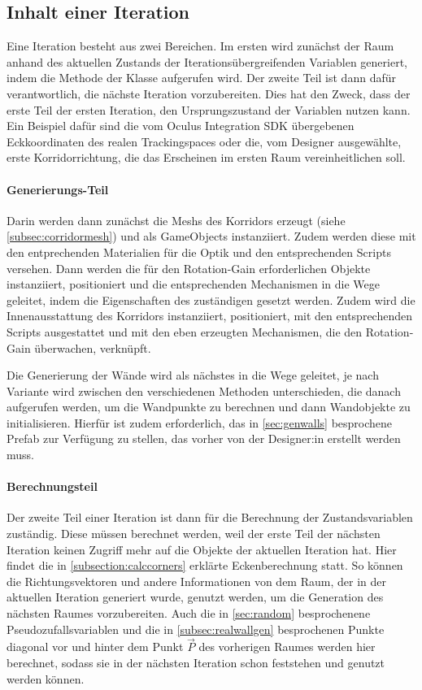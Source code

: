 \subsection{Inhalt einer Iteration}\label{subsec:iteration}
Eine Iteration besteht aus zwei Bereichen. Im ersten wird zunächst der Raum anhand des aktuellen Zustands der Iterationsübergreifenden Variablen generiert, indem die  Methode der  Klasse aufgerufen wird. Der zweite Teil ist dann dafür verantwortlich, die nächste Iteration vorzubereiten. Dies hat den Zweck, dass der erste Teil der ersten Iteration, den Ursprungszustand der Variablen nutzen kann. Ein Beispiel dafür sind die vom Oculus Integration SDK übergebenen Eckkoordinaten des realen Trackingspaces oder die, vom Designer ausgewählte, erste Korridorrichtung, die das Erscheinen im ersten Raum vereinheitlichen soll.

\paragraph*{Generierungs-Teil}
Darin werden dann zunächst die Meshs des Korridors erzeugt (siehe \autoref{subsec:corridormesh}) und als GameObjects instanziiert. Zudem werden diese mit den entprechenden Materialien für die Optik und den entsprechenden Scripts versehen.
Dann werden die für den Rotation-Gain erforderlichen Objekte instanziiert, positioniert und die entsprechenden Mechanismen in die Wege geleitet, indem die Eigenschaften des zuständigen  gesetzt werden.
Zudem wird die Innenausstattung des Korridors instanziiert, positioniert, mit den entsprechenden Scripts ausgestattet und mit den eben erzeugten Mechanismen, die den Rotation-Gain überwachen, verknüpft.

Die Generierung der Wände wird als nächstes in die Wege geleitet, je nach Variante wird zwischen den verschiedenen Methoden unterschieden, die danach aufgerufen werden, um die Wandpunkte zu berechnen und dann Wandobjekte zu initialisieren. Hierfür ist zudem erforderlich, das in \autoref{sec:genwalls} besprochene Prefab zur Verfügung zu stellen, das vorher von der Designer:in erstellt werden muss.

\paragraph*{Berechnungsteil}

Der zweite Teil einer Iteration ist dann für die Berechnung der Zustandsvariablen zuständig. Diese müssen berechnet werden, weil der erste Teil der nächsten Iteration keinen Zugriff mehr auf die Objekte der aktuellen Iteration hat. Hier findet die in \autoref{subsection:calccorners} erklärte Eckenberechnung statt. So können die Richtungsvektoren und andere Informationen von dem Raum, der in der aktuellen Iteration generiert wurde, genutzt werden, um die Generation des nächsten Raumes vorzubereiten. Auch die in \autoref{sec:random} besprochenene Pseudozufallsvariablen und die in \autoref{subsec:realwallgen} besprochenen Punkte diagonal vor und hinter dem Punkt $\vec{P}$ des vorherigen Raumes werden hier berechnet, sodass sie in der nächsten Iteration schon feststehen und genutzt werden können.

